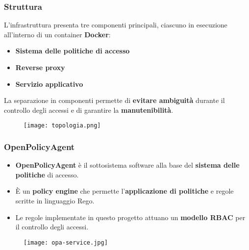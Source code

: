 \documentclass{beamer}
\begin{document}
\begin{frame}
\frametitle{Struttura}
L'infrastruttura presenta tre componenti principali, ciascuno in esecuzione all'interno di un container \textbf{Docker}:
\begin{itemize}
  \item \textbf{Sistema delle politiche di accesso}
  \item \textbf{Reverse proxy}
  \item \textbf{Servizio applicativo}
\end{itemize}

La separazione in componenti permette di \textbf{evitare ambiguità} durante il controllo degli accessi e di garantire la \textbf{manutenibilità}. 

\begin{figure}[h]
  \texttt{[image: topologia.png]}
  \centering
\end{figure}
\end{frame}

\begin{frame}
  \frametitle{OpenPolicyAgent}
  \begin{itemize}
    \item \textbf{OpenPolicyAgent} è il sottosistema software alla base del \textbf{sistema delle politiche} di accesso.
    \item È un \textbf{policy engine} che permette l'\textbf{applicazione di politiche} e regole scritte in linguaggio Rego.
    \item Le regole implementate in questo progetto attuano un \textbf{modello RBAC} per il controllo degli accessi.
  \end{itemize}  
  
  \begin{figure}[h]
    \texttt{[image: opa-service.jpg]}
    \centering
  \end{figure}
  
\end{frame}
\end{document}
